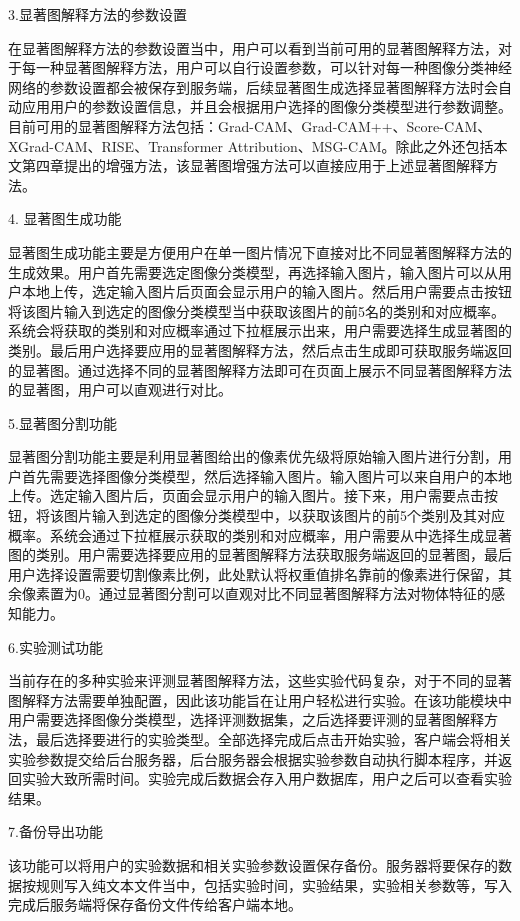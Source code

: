 3.显著图解释方法的参数设置
 
在显著图解释方法的参数设置当中，用户可以看到当前可用的显著图解释方法，对于每一种显著图解释方法，用户可以自行设置参数，可以针对每一种图像分类神经网络的参数设置都会被保存到服务端，后续显著图生成选择显著图解释方法时会自动应用用户的参数设置信息，并且会根据用户选择的图像分类模型进行参数调整。目前可用的显著图解释方法包括：Grad-CAM、Grad-CAM++、Score-CAM、XGrad-CAM、RISE、Transformer Attribution、MSG-CAM。除此之外还包括本文第四章提出的增强方法，该显著图增强方法可以直接应用于上述显著图解释方法。

4. 显著图生成功能

显著图生成功能主要是方便用户在单一图片情况下直接对比不同显著图解释方法的生成效果。用户首先需要选定图像分类模型，再选择输入图片，输入图片可以从用户本地上传，选定输入图片后页面会显示用户的输入图片。然后用户需要点击按钮将该图片输入到选定的图像分类模型当中获取该图片的前5名的类别和对应概率。系统会将获取的类别和对应概率通过下拉框展示出来，用户需要选择生成显著图的类别。最后用户选择要应用的显著图解释方法，然后点击生成即可获取服务端返回的显著图。通过选择不同的显著图解释方法即可在页面上展示不同显著图解释方法的显著图，用户可以直观进行对比。

5.显著图分割功能

显著图分割功能主要是利用显著图给出的像素优先级将原始输入图片进行分割，用户首先需要选择图像分类模型，然后选择输入图片。输入图片可以来自用户的本地上传。选定输入图片后，页面会显示用户的输入图片。接下来，用户需要点击按钮，将该图片输入到选定的图像分类模型中，以获取该图片的前5个类别及其对应概率。系统会通过下拉框展示获取的类别和对应概率，用户需要从中选择生成显著图的类别。用户需要选择要应用的显著图解释方法获取服务端返回的显著图，最后用户选择设置需要切割像素比例，此处默认将权重值排名靠前的像素进行保留，其余像素置为0。通过显著图分割可以直观对比不同显著图解释方法对物体特征的感知能力。

6.实验测试功能

当前存在的多种实验来评测显著图解释方法，这些实验代码复杂，对于不同的显著图解释方法需要单独配置，因此该功能旨在让用户轻松进行实验。在该功能模块中用户需要选择图像分类模型，选择评测数据集，之后选择要评测的显著图解释方法，最后选择要进行的实验类型。全部选择完成后点击开始实验，客户端会将相关实验参数提交给后台服务器，后台服务器会根据实验参数自动执行脚本程序，并返回实验大致所需时间。实验完成后数据会存入用户数据库，用户之后可以查看实验结果。

7.备份导出功能

该功能可以将用户的实验数据和相关实验参数设置保存备份。服务器将要保存的数据按规则写入纯文本文件当中，包括实验时间，实验结果，实验相关参数等，写入完成后服务端将保存备份文件传给客户端本地。

